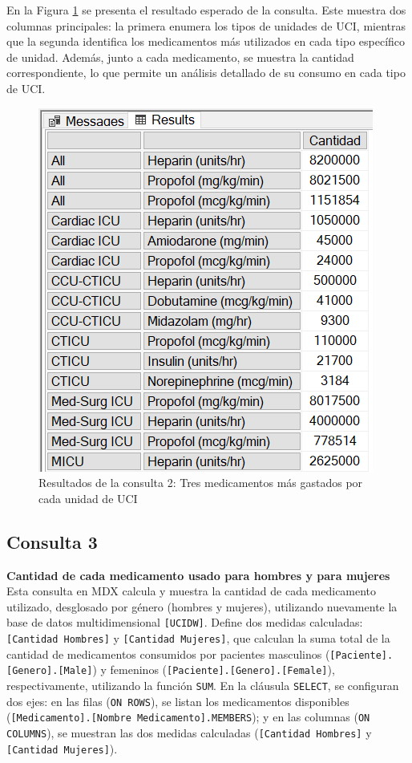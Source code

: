 \documentclass{article}
\begin{document}
En la Figura \ref{fig:consulta2} se presenta el resultado esperado de la consulta. Este muestra dos columnas principales: la primera enumera los tipos de unidades de UCI, mientras que la segunda identifica los medicamentos más utilizados en cada tipo específico de unidad. Además, junto a cada medicamento, se muestra la cantidad correspondiente, lo que permite un análisis detallado de su consumo en cada tipo de UCI.


\begin{figure}[H]
	\centering
	\includegraphics[width=0.4\linewidth]{images/consulta2.png}
	\caption{Resultados de la consulta 2: Tres medicamentos más gastados por cada unidad de UCI}
	\label{fig:consulta2}
\end{figure}


\subsection{Consulta 3}

\textbf{Cantidad de cada medicamento usado para hombres y para mujeres}
\\

Esta consulta en MDX calcula y muestra la cantidad de cada medicamento utilizado, desglosado por género (hombres y mujeres), utilizando nuevamente la base de datos multidimensional \texttt{[UCIDW]}. Define dos medidas calculadas: \texttt{[Cantidad Hombres]} y \texttt{[Cantidad Mujeres]}, que calculan la suma total de la cantidad de medicamentos consumidos por pacientes masculinos (\texttt{[Paciente].[Genero].[Male]}) y femeninos (\texttt{[Paciente].[Genero].[Female]}), respectivamente, utilizando la función \texttt{SUM}. En la cláusula \texttt{SELECT}, se configuran dos ejes: en las filas (\texttt{ON ROWS}), se listan los medicamentos disponibles (\texttt{[Medicamento].[Nombre Medicamento].MEMBERS}); y en las columnas (\texttt{ON COLUMNS}), se muestran las dos medidas calculadas (\texttt{[Cantidad Hombres]} y \texttt{[Cantidad Mujeres]}). 
\\
\end{document}

